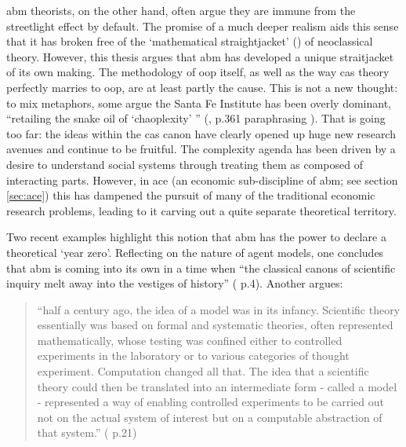 \gls{abm} theorists, on the other hand, often argue they are immune from the streetlight effect by default. The promise of a much deeper realism aids this sense that it has broken free of the `mathematical straightjacket' (\citealt{martin_new_1999}) of neoclassical theory. However, this thesis argues that \gls{abm} has developed a unique straitjacket of its own making. The methodology of \gls{oop} itself, as well as the way \gls{cas} theory perfectly marries to \gls{oop}, are at least partly the cause. This is not a new thought: to mix metaphors, some argue the Santa Fe Institute has been overly dominant, ``retailing the snake oil of `chaoplexity' '' (\citealt{mirowski_kicking_2007}, p.361 paraphrasing \citealt{horgan_end_1998}). That is going too far: the ideas within the \gls{cas} canon have clearly opened up huge new research avenues and continue to be fruitful. The complexity agenda has been driven by a desire to understand social systems through treating them as composed of interacting parts. However, in \gls{ace} (an economic sub-discipline of \gls{abm}; see section \ref{sec:ace}) this has dampened the pursuit of many of the traditional economic research problems, leading to it carving out a quite separate theoretical territory. 

Two recent examples highlight this notion that \gls{abm} has the power to declare a theoretical `year zero'. Reflecting on the nature of agent models, one concludes that \gls{abm} is coming into its own in a time when ``the classical canons of scientific inquiry melt away into the vestiges of history'' (\citealt{batty_generic_2012} p.4). Another argues:

\begin{quote}
``half a century ago, the idea of a model was in its infancy. Scientific theory essentially was based on formal and systematic theories, often represented mathematically, whose testing was confined either to controlled experiments in the laboratory or to various categories of thought experiment. Computation changed all that. The idea that a scientific theory could then be translated into an intermediate form - called a model - represented a way of enabling controlled experiments to be carried out not on the actual system of interest but on a computable abstraction of that system.'' (\citealt{batty_perspectives_2012} p.21)
\end{quote}

